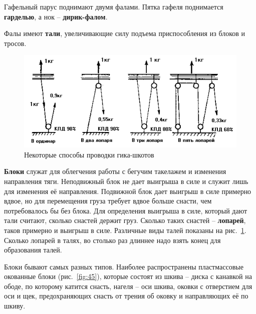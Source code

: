 \documentclass[a4paper, 12pt, twoside, final]{scrbook}
\begin{document}
Гафельный парус поднимают двумя фалами. Пятка гафеля поднимается \textbf{гарделью}, а нок \--- \textbf{дирик-фалом}.

Фалы имеют \textbf{тали}, увеличивающие силу подъема приспособления
из блоков и тросов.

\begin{figure}[htbp]
\begin{centering}
\includegraphics{Provodka_gika-shkotov}
\par\end{centering}

\protect\caption{\label{fig:44}Некоторые способы проводки гика-шкотов}


\end{figure}


\textbf{Блоки} служат для облегчения работы с бегучим такелажем и
изменения направления тяги. Неподвижный блок не дает выигрыша в силе
и служит лишь для изменения её направления. Подвижной блок дает выигрыш
в силе примерно вдвое, но для перемещения груза требует вдвое больше
снасти, чем потребовалось бы без блока. Для определения выигрыша в
силе, который дают тали считают, сколько снастей держит груз. Сколько
таких снастей \--- \textbf{лопарей}, таков примерно и выигрыш в силе. Различные
виды талей показаны на рис.~\ref{fig:44}.
Сколько лопарей в талях, во столько раз длиннее надо взять конец для
образования талей.

Блоки бывают самых разных типов. Наиболее распространены пластмассовые
окованные блоки (рис.~\ref{fig:45}),
которые состоят из шкива \--- диска с канавкой на ободе, по которому катится
снасть, нагеля \--- оси шкива, оковки с отверстием для оси и щек, предохраняющих
снасть от трения об оковку и направляющих её по шкиву.
\end{document}
